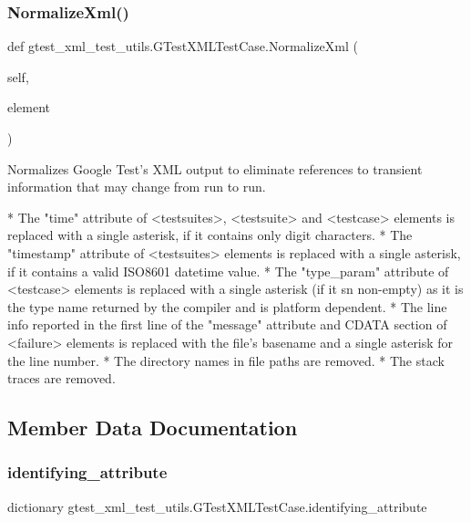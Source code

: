 \subsubsection{\texorpdfstring{NormalizeXml()}{NormalizeXml()}}
{\footnotesize\ttfamily def gtest\+\_\+xml\+\_\+test\+\_\+utils.\+G\+Test\+X\+M\+L\+Test\+Case.\+Normalize\+Xml (\begin{DoxyParamCaption}\item[{}]{self,  }\item[{}]{element }\end{DoxyParamCaption})}

\begin{DoxyVerb}Normalizes Google Test's XML output to eliminate references to transient
information that may change from run to run.

*  The "time" attribute of <testsuites>, <testsuite> and <testcase>
   elements is replaced with a single asterisk, if it contains
   only digit characters.
*  The "timestamp" attribute of <testsuites> elements is replaced with a
   single asterisk, if it contains a valid ISO8601 datetime value.
*  The "type_param" attribute of <testcase> elements is replaced with a
   single asterisk (if it sn non-empty) as it is the type name returned
   by the compiler and is platform dependent.
*  The line info reported in the first line of the "message"
   attribute and CDATA section of <failure> elements is replaced with the
   file's basename and a single asterisk for the line number.
*  The directory names in file paths are removed.
*  The stack traces are removed.
\end{DoxyVerb}
 

\subsection{Member Data Documentation}
\mbox{\label{classgtest__xml__test__utils_1_1GTestXMLTestCase_a0e3a4e84e18f29d2248dcd670a0a6ae6}} 
\subsubsection{\texorpdfstring{identifying\_attribute}{identifying\_attribute}}
{\footnotesize\ttfamily dictionary gtest\+\_\+xml\+\_\+test\+\_\+utils.\+G\+Test\+X\+M\+L\+Test\+Case.\+identifying\+\_\+attribute\hspace{0.3cm}{\ttfamily [static]}}

